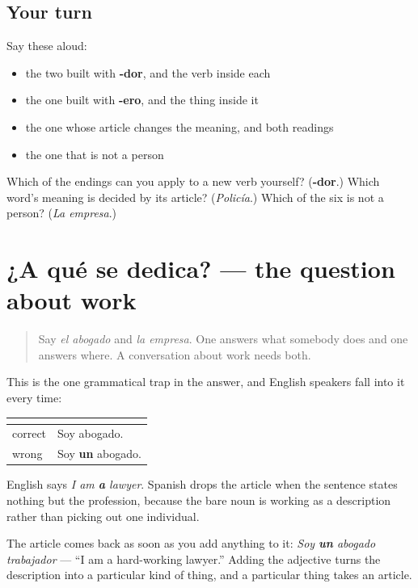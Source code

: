 \subsection*{Your turn}
Say these aloud:

\begin{itemize}
\raggedright
  \item the two built with \textbf{-dor}, and the verb inside each
  \item the one built with \textbf{-ero}, and the thing inside it
  \item the one whose article changes the meaning, and both readings
  \item the one that is not a person
\end{itemize}

\begin{tcolorbox}[breakable,colback=teal!4,colframe=teal!35!black,title={Before you move on}]
Which of the endings can you apply to a new verb yourself? (\textbf{-dor}.) Which word's meaning is decided by its article? (\emph{Policía}.) Which of the six is not a person? (\emph{La empresa}.)
\end{tcolorbox}
\section[¿A qué se dedica?]{¿A qué se dedica? — the question about work}

\label{lesson:ES-C427-sintesis-profesion}



\begin{quote}
Say \emph{el abogado} and \emph{la empresa}. One answers what somebody does and one answers where. A conversation about work needs both.
\end{quote}

\begin{grammarlens}[title={Grammar Lens: naming a profession takes no article}]
This is the one grammatical trap in the answer, and English speakers fall into it every time:

\noindent
\begin{tabularx}{\linewidth}{@{}>{\raggedright\arraybackslash}X>{\raggedright\arraybackslash}X@{}}
\toprule
\textbf{} & \textbf{} \\
\midrule
correct & Soy abogado. \\
wrong & Soy \textbf{un} abogado. \\
\bottomrule
\end{tabularx}

English says \emph{I am \textbf{a} lawyer}. Spanish drops the article when the sentence states nothing but the profession, because the bare noun is working as a description rather than picking out one individual.

The article comes back as soon as you add anything to it: \emph{Soy \textbf{un} abogado trabajador} — \textquotedblleft{}I am a hard-working lawyer.\textquotedblright{} Adding the adjective turns the description into a particular kind of thing, and a particular thing takes an article.
\end{grammarlens}

